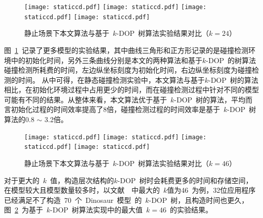 \begin{figure}[htbp] 
\centering
{}
{  
   \texttt{[image: staticcd.pdf]}
}
{  
    \texttt{[image: staticcd.pdf]}
}\linebreak %
{  
   \texttt{[image: staticcd.pdf]}
}
{  
   \texttt{[image: staticcd.pdf]}
}
\caption{静止场景下本文算法与基于~$k$-DOP~树算法实验结果对比（$k=24$）}
\label{fig:chart:exps:kdop:kcbp:k24}
\end{figure}

图~\ref{fig:chart:exps:kdop:kcbp:k24}~记录了更多模型的实验结果，其中曲线三角形和正方形记录的是碰撞检测环境中的初始化时间，另外三条曲线分别是本文的两种算法和基于$k$-DOP~的树算法碰撞检测所耗费的时间，左边纵坐标刻度为初始化时间，右边纵坐标刻度为碰撞检测的时间。
从中可得，在静态碰撞检测实验中，本文算法与基于$k$-DOP~树的算法相比，在初始化环境过程中占用更少的时间，而在碰撞检测过程中针对不同的模型可能有不同的结果。从整体来看，本文算法优于基于~$k$-DOP~树的算法，平均而言初始化过程的时间效率提高了8倍，碰撞检测过程的时间效率是基于~$k$-DOP~树算法的0.8 $\sim$ 3.2倍。

\begin{figure}[htbp] 
\centering
{}
{  
   \texttt{[image: staticcd.pdf]}
}
{  
    \texttt{[image: staticcd.pdf]}
}\linebreak %
{  
   \texttt{[image: staticcd.pdf]}
}
{  
   \texttt{[image: staticcd.pdf]}
}
\caption{静止场景下本文算法与基于~$k$-DOP~树算法实验结果对比（$k=46$）}
\label{fig:chart:exps:kdop:kcbp:k46}
\end{figure}

对于更大的~$k$~值，构造层次结构的$k$-DOP~树时会耗费更多的时间和存储空间，在模型较大且模型数量较多时，以文献~~中最大的~$k$值为46~为例，32位应用程序已经满足不了构造~70~个~Dinosaur~模型~的~$k$-DOP~树，且构造时间也更久，图~\ref{fig:chart:exps:kdop:kcbp:k46}~为基于~$k$-DOP~树算法实现中的最大值~$k=46$~的实验结果。


